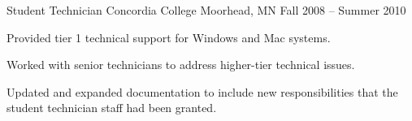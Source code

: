 \cventry
{Student Technician} %
{Concordia College} %
{Moorhead, MN} %
{Fall 2008 – Summer 2010} %
{
  	\begin{cvitems} %
        \item {Provided tier 1 technical support for Windows and Mac systems.}
		\item {Worked with senior technicians to address higher-tier technical issues.}
		\item {Updated and expanded documentation to include new responsibilities that the student technician staff had been granted.}
	\end{cvitems}
}